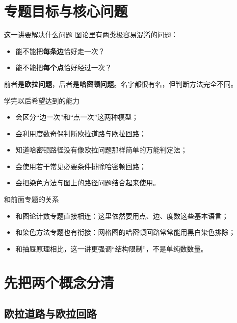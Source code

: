 \documentclass[11pt,a4paper,fontset=fandol]{ctexart}
\theoremstyle{formaltheorem}
\theoremstyle{formalexample}
\begin{document}
\pagestyle{plain}
\tableofcontents
\newpage
\pagestyle{fancy}

\section{专题目标与核心问题}

\begin{goalbox}{这一讲要解决什么问题}
图论里有两类极容易混淆的问题：
\begin{itemize}
  \item 能不能把\textbf{每条边}恰好走一次？
  \item 能不能把\textbf{每个点}恰好经过一次？
\end{itemize}
前者是\textbf{欧拉问题}，后者是\textbf{哈密顿问题}。名字都很有名，但判断方法完全不同。
\end{goalbox}

\begin{goalbox}{学完以后希望达到的能力}
\begin{itemize}
  \item 会区分“边一次”和“点一次”这两种模型；
  \item 会利用度数奇偶判断欧拉道路与欧拉回路；
  \item 知道哈密顿路径没有像欧拉问题那样简单的万能判定法；
  \item 会使用若干常见必要条件排除哈密顿回路；
  \item 会把染色方法与图上的路径问题结合起来使用。
\end{itemize}
\end{goalbox}

\begin{notebox}{和前面专题的关系}
\begin{itemize}
  \item 和图论计数专题直接相连：这里依然要用点、边、度数这些基本语言；
  \item 和染色方法专题也有衔接：网格图的哈密顿回路常常能用黑白染色排除；
  \item 和抽屉原理相比，这一讲更强调“结构限制”，不是单纯数数量。
\end{itemize}
\end{notebox}

\section{先把两个概念分清}

\subsection{欧拉道路与欧拉回路}
\end{document}

